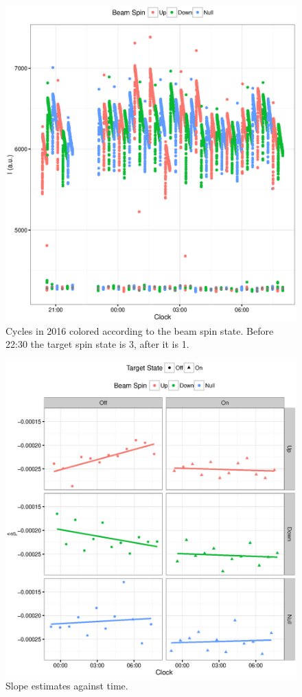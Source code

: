 \documentclass{report}
\begin{document}
\begin{figure}
	\centering
	\includegraphics{Cycles2016.eps}
	\caption{Cycles in 2016 colored according to the beam spin state. Before 22:30 the target spin state is 3, after it is 1.\label{fig:Cycles}}
\end{figure}
\begin{figure}
	\centering
	\includegraphics{Slopes2016_VS_Clock.eps}
	\caption{Slope estimates against time.\label{fig:Slopes}}
\end{figure}	
	
\end{document}
